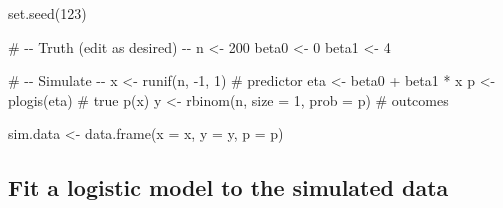 \documentclass[
  letterpaper,
]{scrbook}
\newenvironment{Shaded}{\begin{snugshade}}{\end{snugshade}}
\newcommand{\AttributeTok}[1]{\textcolor[rgb]{0.40,0.45,0.13}{#1}}
\newcommand{\CommentTok}[1]{\textcolor[rgb]{0.37,0.37,0.37}{#1}}
\newcommand{\DecValTok}[1]{\textcolor[rgb]{0.68,0.00,0.00}{#1}}
\newcommand{\FunctionTok}[1]{\textcolor[rgb]{0.28,0.35,0.67}{#1}}
\newcommand{\NormalTok}[1]{\textcolor[rgb]{0.00,0.23,0.31}{#1}}
\newcommand{\OtherTok}[1]{\textcolor[rgb]{0.00,0.23,0.31}{#1}}
\newcommand{\SpecialCharTok}[1]{\textcolor[rgb]{0.37,0.37,0.37}{#1}}
\begin{document}
\begin{Shaded}
\begin{Highlighting}[]
\FunctionTok{set.seed}\NormalTok{(}\DecValTok{123}\NormalTok{)}

\CommentTok{\# {-}{-} Truth (edit as desired) {-}{-}}
\NormalTok{n     }\OtherTok{\textless{}{-}} \DecValTok{200}
\NormalTok{beta0 }\OtherTok{\textless{}{-}} \DecValTok{0}
\NormalTok{beta1 }\OtherTok{\textless{}{-}}  \DecValTok{4}

\CommentTok{\# {-}{-} Simulate {-}{-}}
\NormalTok{x   }\OtherTok{\textless{}{-}} \FunctionTok{runif}\NormalTok{(n, }\SpecialCharTok{{-}}\DecValTok{1}\NormalTok{, }\DecValTok{1}\NormalTok{)             }\CommentTok{\# predictor}
\NormalTok{eta }\OtherTok{\textless{}{-}}\NormalTok{ beta0 }\SpecialCharTok{+}\NormalTok{ beta1 }\SpecialCharTok{*}\NormalTok{ x}
\NormalTok{p   }\OtherTok{\textless{}{-}} \FunctionTok{plogis}\NormalTok{(eta)                 }\CommentTok{\# true p(x)}
\NormalTok{y   }\OtherTok{\textless{}{-}} \FunctionTok{rbinom}\NormalTok{(n, }\AttributeTok{size =} \DecValTok{1}\NormalTok{, }\AttributeTok{prob =}\NormalTok{ p) }\CommentTok{\# outcomes}

\NormalTok{sim.data }\OtherTok{\textless{}{-}} \FunctionTok{data.frame}\NormalTok{(}\AttributeTok{x =}\NormalTok{ x, }\AttributeTok{y =}\NormalTok{ y, }\AttributeTok{p =}\NormalTok{ p)}
\end{Highlighting}
\end{Shaded}

\subsection{Fit a logistic model to the simulated
data}\label{fit-a-logistic-model-to-the-simulated-data}
\end{document}
